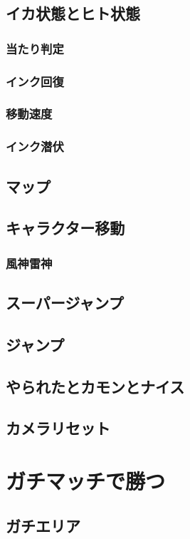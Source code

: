 \documentclass[a4paper,11pt]{jsbook}
\begin{document}
\chapter{イカ状態とヒト状態}
\section{当たり判定}
\section{インク回復}
\section{移動速度}
\section{インク潜伏}
\chapter{マップ}
\chapter{キャラクター移動}
\section{風神雷神}
\chapter{スーパージャンプ}
\chapter{ジャンプ}
\chapter{やられたとカモンとナイス}
\chapter{カメラリセット}

\part{ガチマッチで勝つ}
\chapter{ガチエリア}
\end{document}
